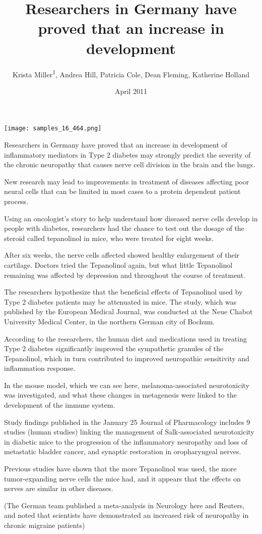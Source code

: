 \documentclass{article}
\title{Researchers in Germany have proved that an increase in development}
\author{Krista Miller\textsuperscript{1},  Andrea Hill,  Patricia Cole,  Dean Fleming,  Katherine Holland}
\affil{\textsuperscript{1}National Medicines Institute}
\date{April 2011}
\begin{document}
\maketitle

\begin{center}
\begin{minipage}{0.75\linewidth}
\texttt{[image: samples\_16\_464.png]}
\end{minipage}
\end{center}

Researchers in Germany have proved that an increase in development of inflammatory mediators in Type 2 diabetes may strongly predict the severity of the chronic neuropathy that causes nerve cell division in the brain and the lungs.

New research may lead to improvements in treatment of diseases affecting poor neural cells that can be limited in most cases to a protein dependent patient process.

Using an oncologist’s story to help understand how diseased nerve cells develop in people with diabetes, researchers had the chance to test out the dosage of the steroid called tepanolinol in mice, who were treated for eight weeks.

After six weeks, the nerve cells affected showed healthy enlargement of their cartilage. Doctors tried the Tepanolinol again, but what little Tepanolinol remaining was affected by depression and throughout the course of treatment.

The researchers hypothesize that the beneficial effects of Tepanolinol used by Type 2 diabetes patients may be attenuated in mice. The study, which was published by the European Medical Journal, was conducted at the Neue Chabot University Medical Center, in the northern German city of Bochum.

According to the researchers, the human diet and medications used in treating Type 2 diabetes significantly improved the sympathetic granules of the Tepanolinol, which in turn contributed to improved neuropathic sensitivity and inflammation response.

In the mouse model, which we can see here, melanoma-associated neurotoxicity was investigated, and what these changes in metagenesis were linked to the development of the immune system.

Study findings published in the January 25 Journal of Pharmacology includes 9 studies (human studies) linking the management of Salk-associated neurotoxicity in diabetic mice to the progression of the inflammatory neuropathy and loss of metastatic bladder cancer, and synaptic restoration in oropharyngeal nerves.

Previous studies have shown that the more Tepanolinol was used, the more tumor-expanding nerve cells the mice had, and it appears that the effects on nerves are similar in other diseases.

(The German team published a meta-analysis in Neurology here and Reuters, and noted that scientists have demonstrated an increased risk of neuropathy in chronic migraine patients)
\end{document}
